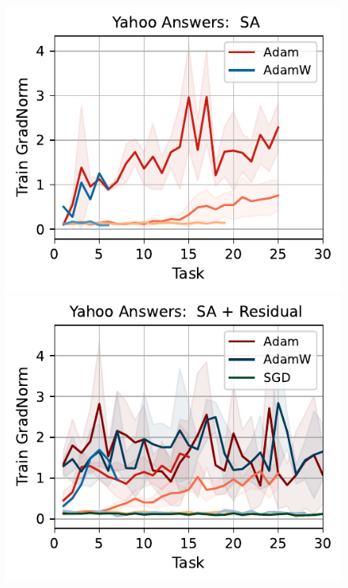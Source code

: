 \begin{figure}[htb!]
{    \includegraphics[width=\textwidth]{figs/GradNorm/nlp/attention/yahoo_answers_40.pdf}
    \includegraphics[width=\textwidth]{figs/GradNorm/nlp/attention_residual/yahoo_answers_40.pdf}
}
\end{figure}
